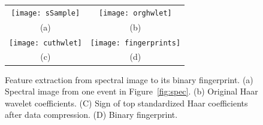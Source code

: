 

\begin{figure}
	\centering
	\begin{tabular}{cc}
		\texttt{[image: sSample]} & 
		\texttt{[image: orghwlet]}  \\
		(a) & (b) \\
		\texttt{[image: cuthwlet]} & 
		\texttt{[image: fingerprints]}  \\
		(c) & (d)
	\end{tabular}
	\caption{Feature extraction from spectral image to its binary fingerprint. (a) Spectral image from one event in Figure~\ref{fig:spec}. (b) Original Haar wavelet coefficients. (C) Sign of top standardized Haar coefficients after data compression. (D) Binary fingerprint. }\label{fig:feature}
\end{figure}